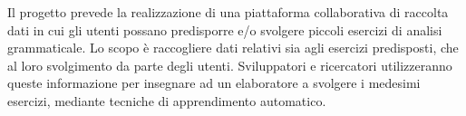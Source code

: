Il progetto prevede la realizzazione di una piattaforma collaborativa di raccolta dati in cui gli utenti possano predisporre e/o svolgere piccoli esercizi di analisi grammaticale. Lo scopo è raccogliere dati relativi sia  agli esercizi predisposti, che al loro svolgimento da parte degli utenti. Sviluppatori e ricercatori utilizzeranno queste informazione per insegnare ad un elaboratore a svolgere i medesimi esercizi, mediante tecniche di apprendimento automatico.

